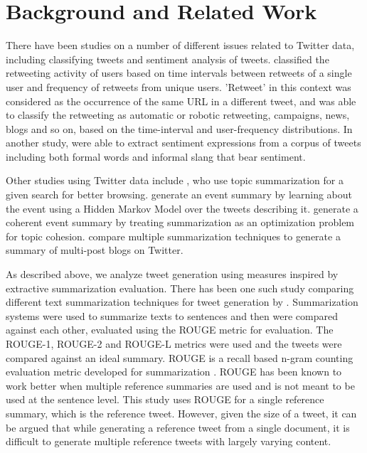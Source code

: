 \section{Background and Related Work}
\label{sec:background}

There have been studies on a number of different issues related to Twitter data, including classifying tweets and sentiment analysis of tweets.  classified the retweeting activity of users based on time intervals between retweets of a single user and frequency of retweets from unique users. 'Retweet' in this context was considered as the occurrence of the same URL in a different tweet, and was able to classify the retweeting as automatic or robotic retweeting, campaigns, news, blogs and so on, based on the time-interval and user-frequency distributions. In another study,  were able to extract sentiment expressions from a corpus of tweets including both formal words and informal slang that bear sentiment.

Other studies using Twitter data include , who use topic summarization for a given search for better browsing.  generate an event summary by learning about the event using a Hidden Markov Model over the tweets describing it.  generate a coherent event summary by treating summarization as an optimization problem for topic cohesion.  compare multiple summarization techniques to generate a summary of multi-post blogs on Twitter.

As described above, we analyze tweet generation using measures inspired by extractive summarization evaluation. There has been one such study comparing different text summarization techniques for tweet generation by  . Summarization systems were used to summarize texts to sentences and then were compared against each other, evaluated using the ROUGE metric for evaluation. The ROUGE-1, ROUGE-2 and ROUGE-L metrics were used and the tweets were compared against an ideal summary. ROUGE \cite{lin2004rouge} is a recall based n-gram counting evaluation metric developed for summarization \cite{nenkova2006summarization}. ROUGE has been known to work better when multiple reference summaries are used and is not meant to be used at the sentence level. This study uses ROUGE for a single reference summary, which is the reference tweet. However, given the size of a tweet, it can be argued that while generating a reference tweet from a single document, it is difficult to generate multiple reference tweets with largely varying content. 

